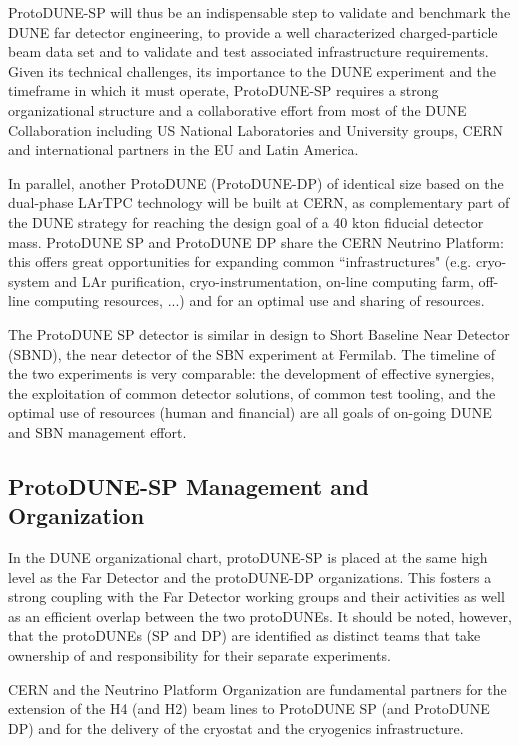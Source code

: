 ProtoDUNE-SP will thus be an indispensable step to validate and benchmark the DUNE far detector engineering, to provide a well characterized charged-particle beam data set and to validate and test associated infrastructure requirements. 
Given its technical challenges, its importance to the DUNE experiment and the timeframe in which it must operate, ProtoDUNE-SP requires a strong organizational structure and a collaborative effort from most of the DUNE Collaboration including  
US National Laboratories and University groups, CERN and international partners in the EU and Latin America. 

In parallel, another ProtoDUNE (ProtoDUNE-DP) of identical size based on the dual-phase LArTPC technology will be built at CERN, as complementary part of the DUNE strategy for reaching the design goal of a 40 kton fiducial detector mass.
ProtoDUNE SP and ProtoDUNE DP share the CERN Neutrino Platform: this offers great opportunities for expanding common ``infrastructures" (e.g. cryo-system and LAr purification, cryo-instrumentation, on-line computing farm, off-line computing resources, ...) and for an optimal use and sharing of resources.

The ProtoDUNE SP detector is similar in design to Short Baseline Near Detector (SBND), the near detector of the SBN experiment at Fermilab. The timeline of the two experiments is very comparable: the development of effective synergies, the exploitation of common detector solutions, of common test tooling, and the optimal use of resources (human and financial) are all goals of on-going DUNE and SBN management effort. 

\subsection{ProtoDUNE-SP Management and Organization}
In the DUNE organizational chart, protoDUNE-SP is placed at the same high level as the Far Detector and the protoDUNE-DP organizations. This fosters a strong coupling with the Far Detector working groups and their activities as well as an efficient 
 overlap between the two protoDUNEs. It should be noted, however, that the protoDUNEs (SP and DP) are identified as distinct teams that take ownership of and responsibility for their separate experiments.
 
CERN and the Neutrino Platform Organization are fundamental partners for the 
 extension of the H4 (and H2) beam lines to ProtoDUNE SP (and ProtoDUNE DP) and for the delivery of the cryostat and the cryogenics infrastructure.

